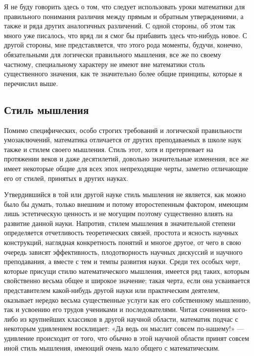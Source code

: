 \documentclass[12pt, a4paper, openany]{book}
\begin{document}
Я не буду говорить здесь о том, что следует  использовать уроки математики для правильного понимания  различия между прямым и обратным утверждениями, а также и ряда других аналогичных различений. С одной стороны, об этом так много уже писалось, что вряд ли я смог бы  прибавить здесь что-нибудь новое. С другой стороны, мне представляется, что этого рода моменты, будучи, конечно, обязательными для логически правильного мышления, все же по своему частному, специальному характеру не имеют вне математики столь существенного значения, как те значительно более общие принципы, которые я  перечислил выше. 

\subsection*{\textbf{Стиль мышления}}

Помимо специфических, особо строгих требований и  логической правильности умозаключений, математика  отличается от других преподаваемых в школе наук также и стилем своего мышления. Стиль этот, хотя и претерпевает на протяжении веков и даже десятилетий, довольно  значительные изменения, все же имеет некоторые общие для всех эпох непреходящие черты, заметно отличающие его от стилей, принятых в других науках. 

Утвердившийся в той или другой науке стиль мышления не является, как можно было бы думать, только внешним и потому второстепенным фактором, имеющим лишь  эстетическую ценность и не могущим поэтому существенно влиять на развитие данной науки. Напротив, стилем  мышления в значительной степени определяется отчетливость теоретических связей, простота и ясность научных  конструкций, наглядная конкретность понятий и многое другое, от чего в свою очередь зависят эффективность,  плодотворность научных дискуссий и научного преподавания, а вместе с тем и темпы развития науки. Среди тех особых черт, которые присущи стилю математического мышления, имеется ряд таких, которым свойственно весьма общее и широкое значение; такая черта, если она усваивается представителем какой-нибудь другой науки или  практическим деятелем, оказывает нередко весьма существенные услуги как его собственному мышлению, так и усвоению его трудов учениками и последователями. Читая сочинения кого-либо из крупнейших классиков в другой научной области, математик подчас с некоторым удивлением  восклицает: «Да ведь он мыслит совсем по-нашему!» —  удивление происходит от того, что обычно в этой научной  области принят совсем иной стиль мышления, имеющий очень мало общего с математическим. 
\end{document}

